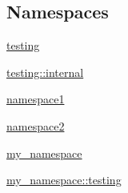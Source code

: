 \subsection*{Namespaces}
\begin{DoxyCompactItemize}
\item 
 \mbox{\hyperlink{namespacetesting}{testing}}
\item 
 \mbox{\hyperlink{namespacetesting_1_1internal}{testing\+::internal}}
\item 
 \mbox{\hyperlink{namespacenamespace1}{namespace1}}
\item 
 \mbox{\hyperlink{namespacenamespace2}{namespace2}}
\item 
 \mbox{\hyperlink{namespacemy__namespace}{my\+\_\+namespace}}
\item 
 \mbox{\hyperlink{namespacemy__namespace_1_1testing}{my\+\_\+namespace\+::testing}}
\end{DoxyCompactItemize}
